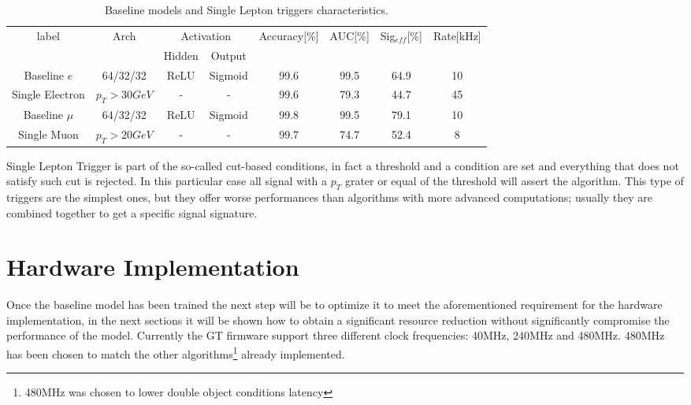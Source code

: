 \documentclass[../../main.tex]{subfiles}
\begin{document}
\begin{center}
    \begin{table}[h]
    \centering
    \begin{tabular}{|c|c|c|c|c|c|c|c|}
        \hline
        \multirow{2}{*}{label} & \multirow{2}{*}{Arch} & \multicolumn{2}{c|}{Activation} & \multirow{2}{*}{Accuracy[\%]} & \multirow{2}{*}{AUC[\%]} & \multirow{2}{*}{Sig$_{eff}$[\%]} & \multirow{2}{*}{Rate[kHz]} \\
        \cline{3-4}
        && Hidden & Output&&&&\\
        \hline
        Baseline $e$ & 64/32/32 & ReLU & Sigmoid & 99.6 & 99.5 & 64.9 & 10 \\
        Single Electron & $p_T>30GeV$ & - & - & 99.6 & 79.3 & 44.7 & 45 \\
        Baseline $\mu$ & 64/32/32 & ReLU & Sigmoid & 99.8 & 99.5 & 79.1 & 10 \\
        Single Muon & $p_T>20GeV$ & - & - & 99.7 & 74.7 & 52.4 & 8  \\
        \hline
    \end{tabular}
    \caption{Baseline models and Single Lepton triggers characteristics.}
    \label{tab:baseline_NN}
    \end{table}
\end{center}

Single Lepton Trigger is part of the so-called cut-based conditions, in fact a threshold and a condition are set and everything that does not satisfy such cut is rejected. In this particular case all signal with a $p_T$ grater or equal of the threshold will assert the algorithm. This type of triggers are the simplest ones, but they offer worse performances than algorithms with more advanced computations; usually they are combined together to get a specific signal signature.

\section{Hardware Implementation}
\label{sec:P2GT_Imp}

Once the baseline model has been trained the next step will be to optimize it to meet the aforementioned requirement for the hardware implementation, in the next sections it will be shown how to obtain a significant resource reduction without significantly compromise the performance of the model.  
Currently the GT firmware support three different clock frequencies: 40MHz, 240MHz and 480MHz. 480MHz has been chosen to match the other algorithms\footnote{480MHz was chosen to lower double object conditions latency} already implemented.
    
\end{document}
